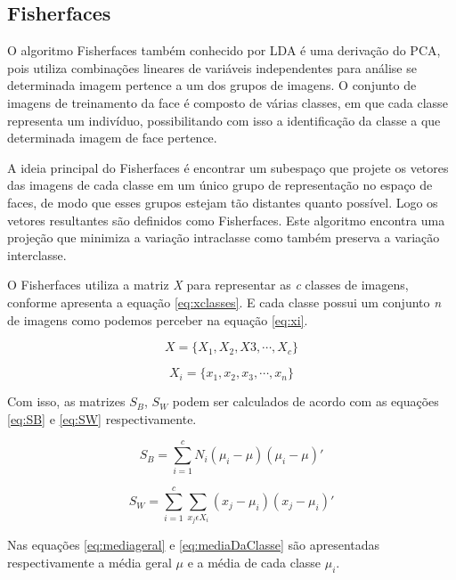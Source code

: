 \subsection{Fisherfaces}

O algoritmo Fisherfaces \cite{belhumeur1997eigenfaces} também conhecido por LDA é uma derivação do PCA, pois utiliza combinações lineares de variáveis independentes para análise se determinada imagem pertence a um dos grupos de imagens. O conjunto de imagens de treinamento da face é composto de várias classes, em que cada classe representa um indivíduo, possibilitando com isso a identificação da classe a que determinada imagem de face pertence. 

A ideia principal do Fisherfaces é encontrar um subespaço que projete os vetores das imagens de cada classe em um único grupo de representação no espaço de faces, de modo que esses grupos estejam tão distantes quanto possível. Logo os vetores resultantes são definidos como Fisherfaces. Este algoritmo encontra uma projeção que minimiza a variação intraclasse como também preserva a variação interclasse.

O Fisherfaces utiliza a matriz \textit{X} para representar as \textit{c} classes de imagens, conforme apresenta a equação \ref{eq:xclasses}. E cada classe possui um conjunto \textit{n} de imagens como podemos perceber na equação \ref{eq:xi}. 

\begin{equation}
X = \{X_1,X_2,X3, \cdots ,X_c\}
\label{eq:xclasses}
\end{equation}


\begin{equation}
X_i = \{x_1,x_2,x_3, \cdots ,x_n\}
\label{eq:xi}
\end{equation}

Com isso, as matrizes \textit{$S_B$}, \textit{$S_W$} podem ser calculados de acordo com as equações \ref{eq:SB} e \ref{eq:SW} respectivamente.

\begin{equation}
S_B = \sum_{i=1}^{c}N_i(\mu_i - \mu)(\mu_i - \mu)'
\label{eq:SB}
\end{equation}

\begin{equation}
S_W = \sum_{i=1}^{c}\sum_{x_j \epsilon X_i}^{ }  (x_j - \mu_i) (x_j - \mu_i)'
\label{eq:SW}
\end{equation}

Nas equações \ref{eq:mediageral} e \ref{eq:mediaDaClasse} são apresentadas respectivamente  a média geral $\mu$ e a média de cada classe $\mu_i$.

